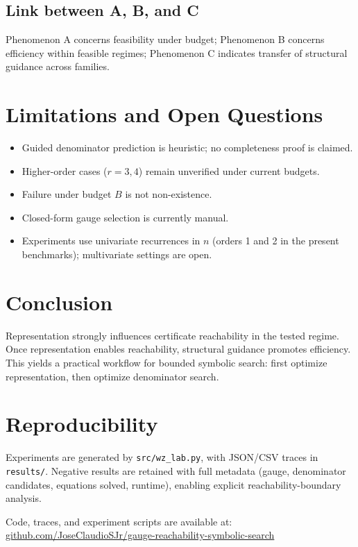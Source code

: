 \documentclass[11pt]{article}
\begin{document}
\subsection{Link between A, B, and C}
Phenomenon A concerns feasibility under budget; Phenomenon B concerns efficiency within feasible regimes; Phenomenon C indicates transfer of structural guidance across families.

\section{Limitations and Open Questions}
\begin{itemize}
\item Guided denominator prediction is heuristic; no completeness proof is claimed.
\item Higher-order cases ($r=3,4$) remain unverified under current budgets.
\item Failure under budget $B$ is not non-existence.
\item Closed-form gauge selection is currently manual.
\item Experiments use univariate recurrences in $n$ (orders 1 and 2 in the present benchmarks); multivariate settings are open.
\end{itemize}

\section{Conclusion}
Representation strongly influences certificate reachability in the tested regime.
Once representation enables reachability, structural guidance promotes efficiency.
This yields a practical workflow for bounded symbolic search: first optimize
representation, then optimize denominator search.

\appendix
\section{Reproducibility}
Experiments are generated by \texttt{src/wz\_lab.py}, with JSON/CSV traces in \texttt{results/}. Negative results are retained with full metadata (gauge, denominator candidates, equations solved, runtime), enabling explicit reachability-boundary analysis.

Code, traces, and experiment scripts are available at:
\href{https://github.com/JoseClaudioSJr/gauge-reachability-symbolic-search}{github.com/JoseClaudioSJr/gauge-reachability-symbolic-search}



\end{document}
